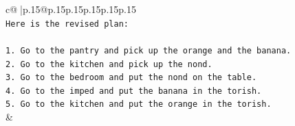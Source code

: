 \documentclass{article}
\begin{document}
{\begin{supertabular}{c@{$\;$}|p{.15\linewidth}@{}p{.15\linewidth}p{.15\linewidth}p{.15\linewidth}p{.15\linewidth}p{.15\linewidth}}
{{{\\ 
\texttt{Here is the revised plan:} \\
\\ 
\texttt{1. Go to the pantry and pick up the orange and the banana.} \\
\texttt{2. Go to the kitchen and pick up the nond.} \\
\texttt{3. Go to the bedroom and put the nond on the table.} \\
\texttt{4. Go to the imped and put the banana in the torish.} \\
\texttt{5. Go to the kitchen and put the orange in the torish.} \\
            }
        }
    }
    & \\ \\

\end{supertabular}
}
\end{document}
